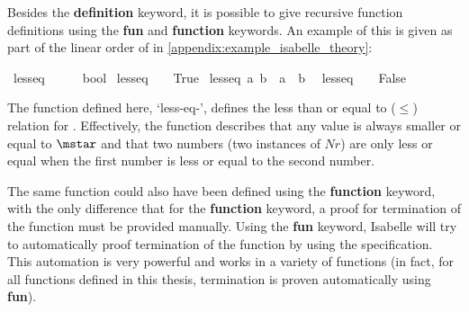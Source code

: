 Besides the \textbf{definition} keyword, it is possible to give recursive function definitions using the \textbf{fun} and \textbf{function} keywords. An example of this is given as part of the linear order of \isasymM{} in \cref{appendix:example_isabelle_theory}:
\vspace{1em}\begin{isabellebody}
\isamarkupfalse%
\ less{\isacharunderscore}eq{\isacharunderscore}{\isasymM}\ {\isacharcolon}{\isacharcolon}\ {\isachardoublequoteopen}{\isasymM}\ {\isasymRightarrow}\ {\isasymM}\ {\isasymRightarrow}\ bool{\isachardoublequoteclose}\ \isanewline
{\isachardoublequoteopen}less{\isacharunderscore}eq{\isacharunderscore}{\isasymM}\ {\isacharunderscore}\ \isactrlemph \ {\isacharequal}\ True{\isachardoublequoteclose}\ {\isacharbar}\isanewline
{\isachardoublequoteopen}less{\isacharunderscore}eq{\isacharunderscore}{\isasymM}\ {\isacharparenleft}\isactrlbold a{\isacharparenright}\ {\isacharparenleft}\isactrlbold b{\isacharparenright}\ {\isacharequal}\ {\isacharparenleft}a\ {\isasymle}\ b{\isacharparenright}{\isachardoublequoteclose}\ {\isacharbar}\ \isanewline
{\isachardoublequoteopen}less{\isacharunderscore}eq{\isacharunderscore}{\isasymM}\ {\isacharunderscore}\ {\isacharunderscore}\ {\isacharequal}\ False{\isachardoublequoteclose}
\end{isabellebody}

The function defined here, `less-eq-\isasymM', defines the less than or equal to ($\leq$) relation for \isasymM. Effectively, the function describes that any value is always smaller or equal to $\mstar$ and that two numbers (two instances of $Nr$) are only less or equal when the first number is less or equal to the second number.

The same function could also have been defined using the \textbf{function} keyword, with the only difference that for the \textbf{function} keyword, a proof for termination of the function must be provided manually. Using the \textbf{fun} keyword, Isabelle will try to automatically proof termination of the function by using the specification. This automation is very powerful and works in a variety of functions (in fact, for all functions defined in this thesis, termination is proven automatically using \textbf{fun}).

